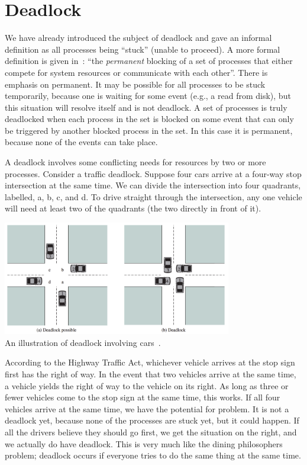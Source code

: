 




\section*{Deadlock}
We have already introduced the subject of deadlock and gave an informal definition as all processes being ``stuck'' (unable to proceed). A more formal definition is given in~\cite{osi}: ``the \textit{permanent} blocking of a set of processes that either compete for system resources or communicate with each other''. There is emphasis on permanent. It may be possible for all processes to be stuck temporarily, because one is waiting for some event (e.g., a read from disk), but this situation will resolve itself and is not deadlock. A set of processes is truly deadlocked when each process in the set is blocked on some event that can only be triggered by another blocked process in the set. In this case it is permanent, because none of the events can take place.

A deadlock involves some conflicting needs for resources by two or more processes. Consider a traffic deadlock. Suppose four cars arrive at a four-way stop intersection at the same time. We can divide the intersection into four quadrants, labelled, a, b, c, and d. To drive straight through the intersection, any one vehicle will need at least two of the quadrants (the two directly in front of it). 

\begin{center}
\includegraphics[width=0.75\textwidth]{images/car-deadlock.png}\\
An illustration of deadlock involving cars~\cite{osi}.
\end{center}

According to the Highway Traffic Act, whichever vehicle arrives at the stop sign first has the right of way. In the event that two vehicles arrive at the same time, a vehicle yields the right of way to the vehicle on its right. As long as three or fewer vehicles come to the stop sign at the same time, this works. If all four vehicles arrive at the same time, we have the potential for problem. It is not a deadlock yet, because none of the processes are stuck yet, but it could happen. If all the drivers believe they should go first, we get the situation on the right, and we actually do have deadlock. This is very much like the dining philosophers problem; deadlock occurs if everyone tries to do the same thing at the same time.

